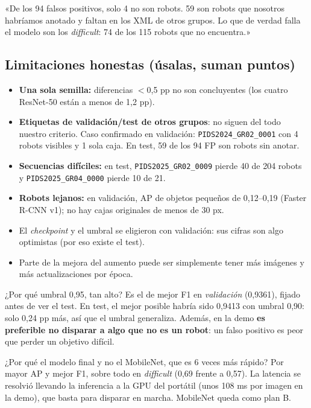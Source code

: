 \documentclass[11pt,a4paper]{article}
\newcommand{\cod}[1]{\texttt{#1}}
\begin{document}
\begin{contar}
«De los 94 falsos positivos, solo 4 no son robots. 59 son robots que nosotros habríamos anotado y faltan en los XML de otros grupos. Lo que de verdad falla el modelo son los \emph{difficult}: 74 de los 115 robots que no encuentra.»
\end{contar}

\subsection{Limitaciones honestas (úsalas, suman puntos)}
\begin{itemize}
  \item \textbf{Una sola semilla:} diferencias $<$0,5 pp no son concluyentes (los cuatro ResNet-50 están a menos de 1,2 pp).
  \item \textbf{Etiquetas de validación/test de otros grupos}: no siguen del todo nuestro criterio. Caso confirmado en validación: \cod{PIDS2024\_\allowbreak{}GR02\_\allowbreak{}0001} con 4 robots visibles y 1 sola caja. En test, 59 de los 94 FP son robots sin anotar.
  \item \textbf{Secuencias difíciles:} en test, \cod{PIDS2025\_\allowbreak{}GR02\_\allowbreak{}0009} pierde 40 de 204 robots y \cod{PIDS2025\_\allowbreak{}GR04\_\allowbreak{}0000} pierde 10 de 21.
  \item \textbf{Robots lejanos:} en validación, AP de objetos pequeños de 0,12--0,19 (Faster R-CNN v1); no hay cajas originales de menos de 30 px.
  \item El \emph{checkpoint} y el umbral se eligieron con validación: sus cifras son algo optimistas (por eso existe el test).
  \item Parte de la mejora del aumento puede ser simplemente tener más imágenes y más actualizaciones por época.
\end{itemize}

\begin{pregunta}{¿Por qué umbral 0,95, tan alto?}
Es el de mejor F1 en \emph{validación} (0,9361), fijado antes de ver el test. En test, el mejor posible habría sido 0,9413 con umbral 0,90: solo 0,24 pp más, así que el umbral generaliza. Además, en la demo \textbf{es preferible no disparar a algo que no es un robot}: un falso positivo es peor que perder un objetivo difícil.
\end{pregunta}

\begin{pregunta}{¿Por qué el modelo final y no el MobileNet, que es 6 veces más rápido?}
Por mayor AP y mejor F1, sobre todo en \emph{difficult} (0,69 frente a 0,57). La latencia se resolvió llevando la inferencia a la GPU del portátil (unos 108 ms por imagen en la demo), que basta para disparar en marcha. MobileNet queda como plan B.
\end{pregunta}
\end{document}
